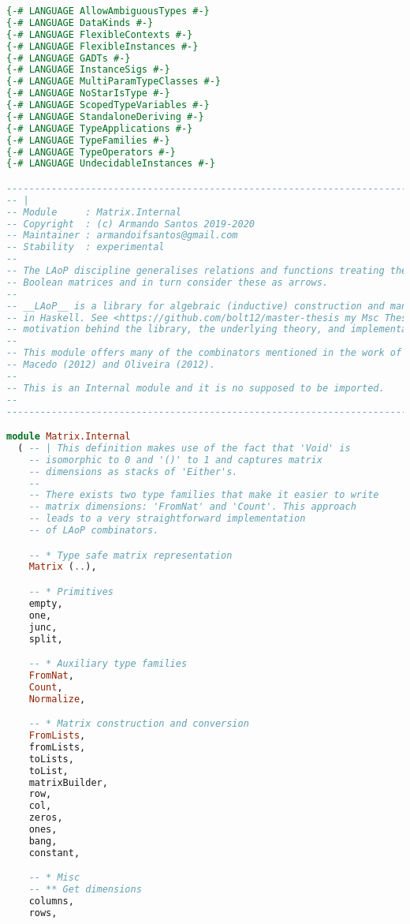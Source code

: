 \documentclass[
  oneside,
  11pt, a4paper,
  footinclude=true,
  headinclude=true,
  cleardoublepage=empty
]{scrbook}
\theoremstyle{definition}
\theoremstyle{definition}
\begin{document}
    \begin{lstlisting}[language=Haskell, caption={Matrix.Internal},captionpos=b]
{-# LANGUAGE AllowAmbiguousTypes #-}
{-# LANGUAGE DataKinds #-}
{-# LANGUAGE FlexibleContexts #-}
{-# LANGUAGE FlexibleInstances #-}
{-# LANGUAGE GADTs #-}
{-# LANGUAGE InstanceSigs #-}
{-# LANGUAGE MultiParamTypeClasses #-}
{-# LANGUAGE NoStarIsType #-}
{-# LANGUAGE ScopedTypeVariables #-}
{-# LANGUAGE StandaloneDeriving #-}
{-# LANGUAGE TypeApplications #-}
{-# LANGUAGE TypeFamilies #-}
{-# LANGUAGE TypeOperators #-}
{-# LANGUAGE UndecidableInstances #-}

-----------------------------------------------------------------------------
-- |
-- Module     : Matrix.Internal
-- Copyright  : (c) Armando Santos 2019-2020
-- Maintainer : armandoifsantos@gmail.com
-- Stability  : experimental
--
-- The LAoP discipline generalises relations and functions treating them as
-- Boolean matrices and in turn consider these as arrows.
--
-- __LAoP__ is a library for algebraic (inductive) construction and manipulation of matrices
-- in Haskell. See <https://github.com/bolt12/master-thesis my Msc Thesis> for the
-- motivation behind the library, the underlying theory, and implementation details.
--
-- This module offers many of the combinators mentioned in the work of
-- Macedo (2012) and Oliveira (2012). 
--
-- This is an Internal module and it is no supposed to be imported.
--
-----------------------------------------------------------------------------

module Matrix.Internal
  ( -- | This definition makes use of the fact that 'Void' is
    -- isomorphic to 0 and '()' to 1 and captures matrix
    -- dimensions as stacks of 'Either's.
    --
    -- There exists two type families that make it easier to write
    -- matrix dimensions: 'FromNat' and 'Count'. This approach
    -- leads to a very straightforward implementation 
    -- of LAoP combinators. 

    -- * Type safe matrix representation
    Matrix (..),

    -- * Primitives
    empty,
    one,
    junc,
    split,

    -- * Auxiliary type families
    FromNat,
    Count,
    Normalize,

    -- * Matrix construction and conversion
    FromLists,
    fromLists,
    toLists,
    toList,
    matrixBuilder,
    row,
    col,
    zeros,
    ones,
    bang,
    constant,

    -- * Misc
    -- ** Get dimensions
    columns,
    rows,


\end{lstlisting}
\end{document}
